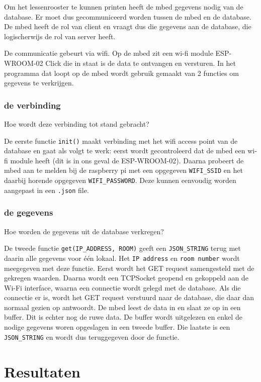 \documentclass[a4paper,kul]{kulakarticle} %
\begin{document}
Om het lessenrooster te kunnen printen heeft de mbed gegevens nodig van de database. Er moet dus gecommuniceerd worden tussen de mbed en de database. De mbed heeft de rol van client en vraagt dus die gegevens aan de database, die logischerwijs de rol van server heeft.
\newline

De communicatie gebeurt via wifi. Op de mbed zit een wi-fi module ESP-WROOM-02 Click \cite{ESP-WROOM-02} die in staat is de data te ontvangen en versturen. In het programma dat loopt op de mbed wordt gebruik gemaakt van 2 functies om gegevens te verkrijgen.

\subsubsection{de verbinding}

Hoe wordt deze verbinding tot stand gebracht?

De eerste functie \verb|init()| maakt verbinding met het wifi access point van de database en gaat als volgt te werk: eerst wordt gecontroleerd dat de mbed een wi-fi module heeft (dit is in ons geval de ESP-WROOM-02). Daarna probeert de mbed aan te melden bij de raspberry pi met een opgegeven \verb|WIFI_SSID| en het daarbij horende opgegeven \verb|WIFI_PASSWORD|. Deze  kunnen eenvoudig worden aangepast in een \verb|.json| file.

\subsubsection{de gegevens}

Hoe worden de gegevens uit de database verkregen?

De tweede functie \verb|get(IP_ADDRESS, ROOM)| geeft een \verb|JSON_STRING| terug met daarin alle gegevens voor één lokaal. Het \verb|IP address| en \verb|room number| wordt meegegeven met deze functie. Eerst wordt het GET request samengesteld met de gekregen waarden. Daarna wordt een TCPSocket geopend en gekoppeld aan de Wi-Fi interface, waarna een connectie wordt gelegd met de database. Als die connectie er is, wordt het GET request verstuurd naar de database, die daar dan normaal gezien op antwoordt. De mbed leest de data in en slaat ze op in een buffer. Dit is echter nog de ruwe data. De buffer wordt uitgelezen en enkel de nodige gegevens woren opgeslagen in een tweede buffer. Die laatste is een \verb|JSON_STRING| en wordt dus teruggegeven door de functie.

\section{Resultaten}
\end{document}
